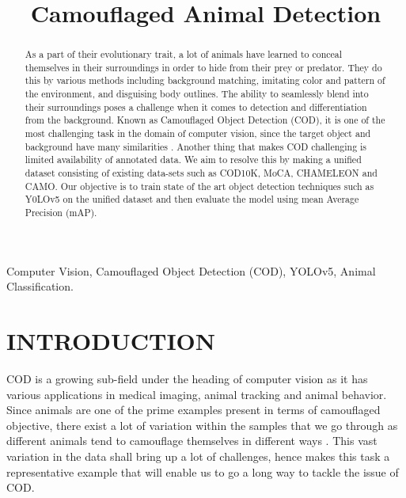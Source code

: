 \documentclass[conference]{IEEEtran}
\begin{document}
\title{Camouflaged Animal Detection}

    
\author{
\and
{}
\and
{}
}


\maketitle

\begin{abstract}
As a part of their evolutionary trait, a lot of animals have learned to conceal themselves in their surroundings in order to hide from their prey or predator. They do this by various methods including background matching, imitating color and
pattern of the environment, and disguising body outlines\cite{price2019background}. 
The ability to seamlessly blend into their surroundings poses a challenge when it comes to detection and differentiation from the background. Known as Camouflaged Object Detection (COD), it is one of the most challenging task in the domain of computer vision, since the target object and background have many similarities \cite{9156837}. Another thing that makes COD challenging is limited availability of annotated data. We aim to resolve this by making a unified dataset consisting of existing data-sets such as COD10K, MoCA, CHAMELEON and CAMO. Our objective is to train state of the art object detection techniques such as Y0LOv5 on the unified dataset and then evaluate the model using mean Average Precision (mAP).

\end{abstract}

\begin{IEEEkeywords}
Computer Vision, Camouflaged Object Detection (COD), YOLOv5, Animal Classification.
\end{IEEEkeywords}

\section{INTRODUCTION}
COD is a growing sub-field under the heading of computer vision as it has various applications in medical imaging, animal tracking and animal behavior. Since animals are one of the prime examples present in terms of camouflaged objective, there exist a lot of variation within the samples that we go through as different animals tend to camouflage themselves in different ways \cite{price2019background}. This vast variation in the data shall bring up a lot of challenges, hence makes this task a representative example that will enable us to go a long way to tackle the issue of COD.
\end{document}
